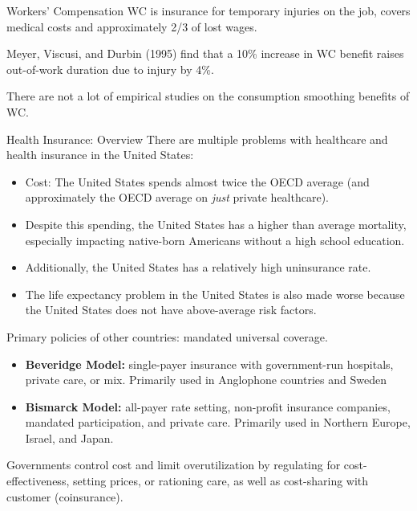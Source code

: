 \documentclass[8pt]{extarticle}
\begin{document}
  \begin{problem}{Workers' Compensation}
    WC is insurance for temporary injuries on the job, covers medical costs and approximately 2/3 of lost wages.\newline

    Meyer, Viscusi, and Durbin (1995) find that a 10\% increase in WC benefit raises out-of-work duration due to injury by 4\%.\newline

    There are not a lot of empirical studies on the consumption smoothing benefits of WC.
  \end{problem}
  \begin{problem}{Health Insurance: Overview}
    There are multiple problems with healthcare and health insurance in the United States:
    \begin{itemize}
      \item Cost: The United States spends almost twice the OECD average (and approximately the OECD average on \textit{just} private healthcare).
      \item Despite this spending, the United States has a higher than average mortality, especially impacting native-born Americans without a high school education.
      \item Additionally, the United States has a relatively high uninsurance rate.
      \item The life expectancy problem in the United States is also made worse because the United States does not have above-average risk factors.
    \end{itemize}
    Primary policies of other countries: mandated universal coverage.
    \begin{itemize}
      \item \textbf{Beveridge Model:} single-payer insurance with government-run hospitals, private care, or mix. Primarily used in Anglophone countries and Sweden
      \item \textbf{Bismarck Model:} all-payer rate setting, non-profit insurance companies, mandated participation, and private care. Primarily used in Northern Europe, Israel, and Japan.
    \end{itemize}
    Governments control cost and limit overutilization by regulating for cost-effectiveness, setting prices, or rationing care, as well as cost-sharing with customer (coinsurance).\\


\end{problem}
\end{document}
